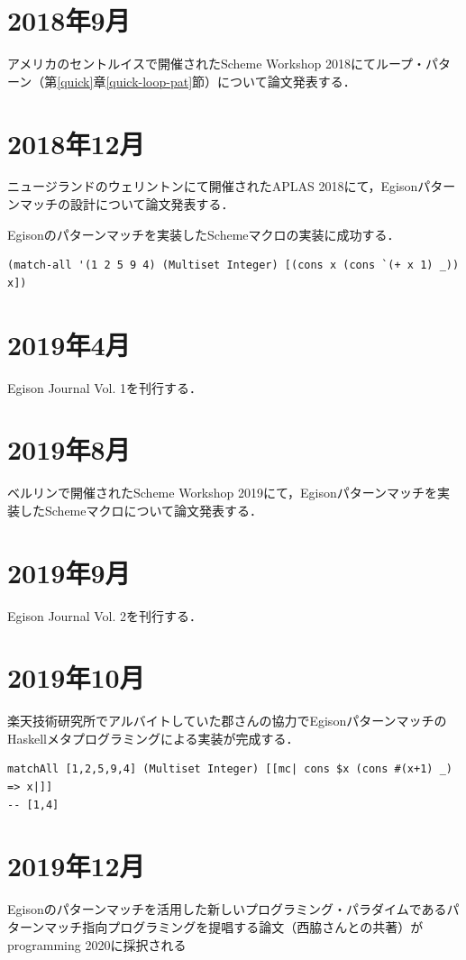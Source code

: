 \section*{2018年9月}

アメリカのセントルイスで開催されたScheme Workshop 2018にてループ・パターン（第\ref{quick}章\ref{quick-loop-pat}節）について論文発表する．

\section*{2018年12月}

ニュージランドのウェリントンにて開催されたAPLAS 2018にて，Egisonパターンマッチの設計について論文発表する．

Egisonのパターンマッチを実装したSchemeマクロの実装に成功する．
\begin{lstlisting}[numbers=none]
(match-all '(1 2 5 9 4) (Multiset Integer) [(cons x (cons `(+ x 1) _)) x])
\end{lstlisting}

\section*{2019年4月}

Egison Journal Vol. 1を刊行する．

\section*{2019年8月}

ベルリンで開催されたScheme Workshop 2019にて，Egisonパターンマッチを実装したSchemeマクロについて論文発表する．

\section*{2019年9月}

Egison Journal Vol. 2を刊行する．

\section*{2019年10月}

楽天技術研究所でアルバイトしていた郡さんの協力でEgisonパターンマッチのHaskellメタプログラミングによる実装が完成する．
\begin{lstlisting}[language=egison,numbers=none]
matchAll [1,2,5,9,4] (Multiset Integer) [[mc| cons $x (cons #(x+1) _) => x|]]
-- [1,4]
\end{lstlisting}

\section*{2019年12月}

Egisonのパターンマッチを活用した新しいプログラミング・パラダイムであるパターンマッチ指向プログラミングを提唱する論文（西脇さんとの共著）が\textlangle{}programming\textrangle{} 2020に採択される
